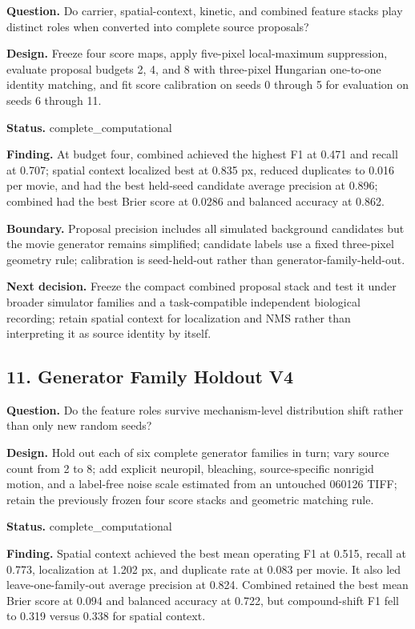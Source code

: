 \textbf{Question.} Do carrier, spatial-context, kinetic, and combined feature stacks play distinct roles when converted into complete source proposals?

\textbf{Design.} Freeze four score maps, apply five-pixel local-maximum suppression, evaluate proposal budgets 2, 4, and 8 with three-pixel Hungarian one-to-one identity matching, and fit score calibration on seeds 0 through 5 for evaluation on seeds 6 through 11.

\textbf{Status.} complete\_computational

\textbf{Finding.} At budget four, combined achieved the highest F1 at 0.471 and recall at 0.707; spatial context localized best at 0.835 px, reduced duplicates to 0.016 per movie, and had the best held-seed candidate average precision at 0.896; combined had the best Brier score at 0.0286 and balanced accuracy at 0.862.

\textbf{Boundary.} Proposal precision includes all simulated background candidates but the movie generator remains simplified; candidate labels use a fixed three-pixel geometry rule; calibration is seed-held-out rather than generator-family-held-out.

\textbf{Next decision.} Freeze the compact combined proposal stack and test it under broader simulator families and a task-compatible independent biological recording; retain spatial context for localization and NMS rather than interpreting it as source identity by itself.

\subsection{11. Generator Family Holdout V4}

\textbf{Question.} Do the feature roles survive mechanism-level distribution shift rather than only new random seeds?

\textbf{Design.} Hold out each of six complete generator families in turn; vary source count from 2 to 8; add explicit neuropil, bleaching, source-specific nonrigid motion, and a label-free noise scale estimated from an untouched 060126 TIFF; retain the previously frozen four score stacks and geometric matching rule.

\textbf{Status.} complete\_computational

\textbf{Finding.} Spatial context achieved the best mean operating F1 at 0.515, recall at 0.773, localization at 1.202 px, and duplicate rate at 0.083 per movie. It also led leave-one-family-out average precision at 0.824. Combined retained the best mean Brier score at 0.094 and balanced accuracy at 0.722, but compound-shift F1 fell to 0.319 versus 0.338 for spatial context.

